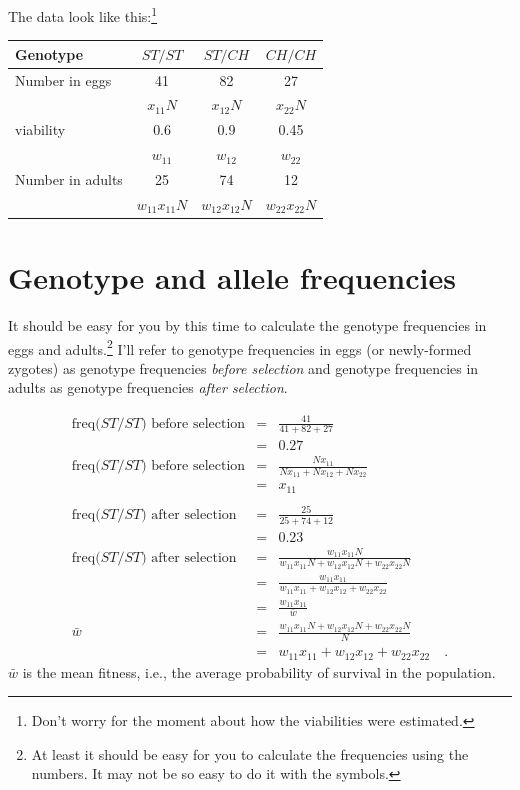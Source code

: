 \documentclass[12pt]{article}
\begin{document}
The data look like this:\footnote{Don't worry for the moment about how
the viabilities were estimated.}

\begin{center}
\begin{tabular}{l|ccc}
\hline\hline
Genotype         & $ST/ST$    & $ST/CH$    & $CH/CH$    \\
\hline
Number in eggs   & 41       & 82       & 27       \\
                 & $x_{11}N$  & $x_{12}N$  & $x_{22}N$  \\
viability        & 0.6      & 0.9      & 0.45     \\
                 & $w_{11}$   & $w_{12}$   & $w_{22}$   \\
Number in adults & 25       & 74       & 12       \\
                 & $w_{11}x_{11}N$ & $w_{12}x_{12}N$ & $w_{22}x_{22}N$ \\
\hline
\end{tabular}
\end{center}

\section*{Genotype and allele frequencies}

It should be easy for you by this time to calculate the genotype
frequencies in eggs and adults.\footnote{At least it should be easy
  for you to calculate the frequencies using the numbers. It may not
  be so easy to do it with the symbols.} I'll refer to genotype
frequencies in eggs (or newly-formed zygotes) as genotype frequencies
{\it before selection\/} and genotype frequencies in adults as
genotype frequencies {\it after selection}.

\begin{eqnarray*}
\mbox{freq($ST/ST$) before selection}
 &=& \frac{41}{41 + 82 + 27} \\
 &=& 0.27 \\
\mbox{freq($ST/ST$) before selection}
 &=& \frac{Nx_{11}}{Nx_{11} + Nx_{12} + Nx_{22}} \\
 &=& x_{11} \\
 && \\
\mbox{freq($ST/ST$) after selection}
 &=& \frac{25}{25 + 74 +12} \\
 &=& 0.23 \\
\mbox{freq($ST/ST$) after selection}
 &=& \frac{w_{11}x_{11}N}{w_{11}x_{11}N + w_{12}x_{12}N + w_{22}x_{22}N} \\
 &=& \frac{w_{11}x_{11}}{w_{11}x_{11} + w_{12}x_{12} +
 w_{22}x_{22}} \\
 &=& \frac{w_{11}x_{11}}{\bar w} \\
 \bar w &=& \frac{w_{11}x_{11}N + w_{12}x_{12}N + w_{22}x_{22}N}{N} \\
        &=& w_{11}x_{11} + w_{12}x_{12} + w_{22}x_{22} \quad .
\end{eqnarray*}
$\bar w$ is the mean fitness, i.e., the average probability of
survival in the population.
\end{document}
